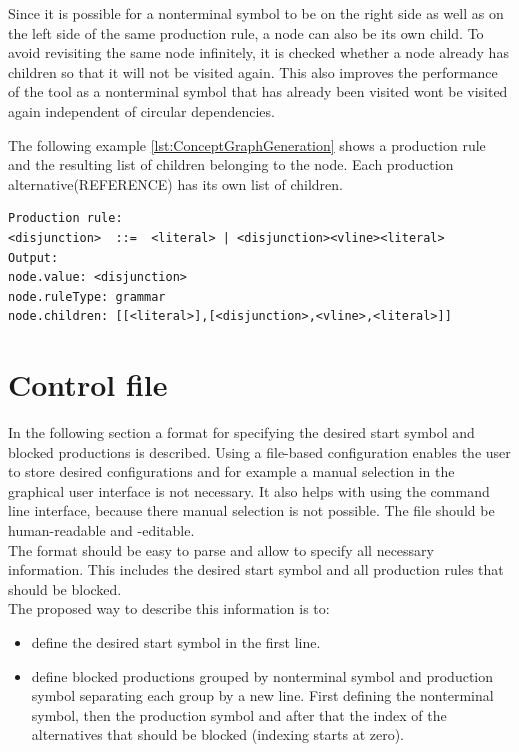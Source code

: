 Since it is possible for a nonterminal symbol to be on the right side as well as on the left side of the same production rule, a node can also be its own child. To avoid revisiting the same node infinitely, it is checked whether a node already has children so that it will not be visited again. This also improves the performance of the tool as a nonterminal symbol that has already been visited wont be visited again independent of circular dependencies.

The following example \ref{lst:ConceptGraphGeneration} shows a production rule and the resulting list of children belonging to the node. Each production alternative(REFERENCE) has its own list of children. %
\begin{lstlisting}[caption= Graph generation,label= lst:ConceptGraphGeneration]
Production rule: 
<disjunction>  ::=  <literal> | <disjunction><vline><literal> 
Output:
node.value: <disjunction>
node.ruleType: grammar
node.children: [[<literal>],[<disjunction>,<vline>,<literal>]]
\end{lstlisting}

\section{Control file}\label{sec:ConceptControlFile}
In the following section a format for specifying the desired start symbol and blocked productions is described.
Using a file-based configuration enables the user to store desired configurations and for example a manual selection in the graphical user interface is not necessary.
It also helps with using the command line interface, because there manual selection is not possible.
The file should be human-readable and -editable.\\
The format should be easy to parse and allow to specify all necessary information.
This includes the desired start symbol and all production rules that should be blocked.\\
The proposed way to describe this information is to:

\begin{itemize}%
	\item define the desired start symbol in the first line.
	\item define blocked productions grouped by nonterminal symbol and production symbol separating each group by a new line.
	First defining the nonterminal symbol, then the production symbol and after that the index of the alternatives that should be blocked (indexing starts at zero). 
\end{itemize}


